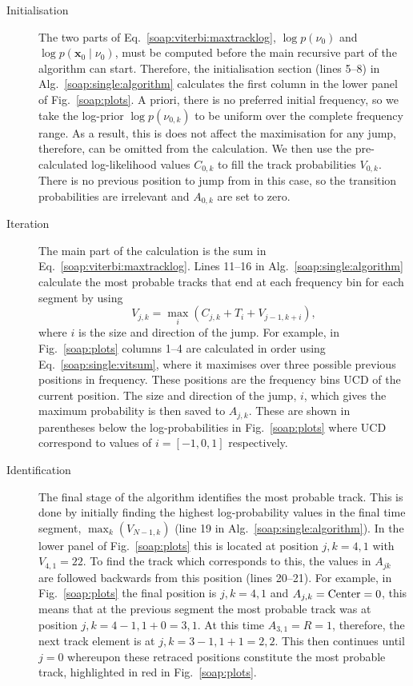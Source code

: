 \begin{description}
%
%
\item[Initialisation] The two parts of Eq.~\ref{soap:viterbi:maxtracklog},  $\log p(\nu_0)$ and $\log p({\bm x_0} \mid \nu_0)$, must be computed before the main recursive part of the algorithm can start. Therefore, the initialisation section (lines 5--8) in Alg.~\ref{soap:single:algorithm} calculates the first column in the lower panel of Fig.~\ref{soap:plots}. A priori, there is no preferred initial frequency, so we take the log-prior $\log p(\nu_{0,k})$ to be uniform over the complete frequency range. As a result, this is does not affect the maximisation for any jump, therefore, can be omitted from the calculation. We then use the pre-calculated log-likelihood values $C_{0,k}$ to fill the track probabilities $V_{0,k}$.  There is no previous position to jump from in this case, so the transition probabilities are irrelevant and $A_{0,k}$ are set to zero.
%
%
\item[Iteration] The main part of the calculation is the sum in Eq.~\ref{soap:viterbi:maxtracklog}. Lines 11--16 in Alg.~\ref{soap:single:algorithm} calculate the most probable tracks that end at each frequency bin for each segment by using
    \begin{equation} \label{soap:single:vitsum}
    V_{j,k} = \max_{i}({C_{j,k} }+ T_{i} + V_{j-1,k+i}),
    \end{equation}
    where $i$ is the size and direction of the jump. For example, in Fig.~\ref{soap:plots} columns 1--4 are calculated in order using Eq.~\ref{soap:single:vitsum}, where it maximises over three possible previous positions in frequency. These positions are the frequency bins \gls{UCD} of the current position. The size and direction of the jump, $i$, which gives the maximum probability is then saved to $A_{j,k}$. These are shown in parentheses below the log-probabilities in Fig.~\ref{soap:plots} where \gls{UCD} correspond to values of $i = [-1,0,1]$ respectively.
%
%
\item[Identification] The final stage of the algorithm identifies the most probable track. This is done by initially finding the highest log-probability values in the final time segment, $\max_k(V_{N-1,k})$ (line 19 in Alg.~\ref{soap:single:algorithm}). In the lower panel of Fig.~\ref{soap:plots} this is located at position $j,k = 4,1$ with $V_{4,1} = 22$. To find the track which corresponds to this, the values in $A_{jk}$ are followed backwards from this position (lines 20--21). For example, in Fig.~\ref{soap:plots} the final position is $j,k = 4,1$ and $A_{j,k} = \rm{Center} = 0$, this means that at the previous segment the most probable track was at position $j,k = 4-1,1+0 = 3,1$. At this time $A_{3,1} = R = 1$, therefore, the next track element is at $j,k = 3-1,1+1 = 2,2$. This then continues until $j=0$ whereupon these retraced positions constitute the most probable track, highlighted in red in Fig.~\ref{soap:plots}.
%
\end{description}


